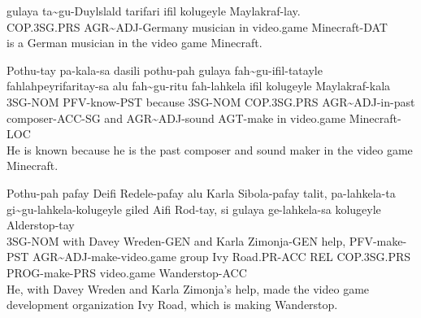 \begin{exe}
    \ex{} \gll{}gulaya ta\~{}gu-Duylslald tarifari ifil kolugeyle Maylakraf-lay.\\
                COP.3SG.PRS AGR\~{}ADJ-Germany musician in video.game Minecraft-DAT\\
          \glt{}is a German musician in the video game Minecraft.
\end{exe}

\begin{exe}
    \ex{} \gll{}Pothu-tay pa-kala-sa dasili pothu-pah gulaya fah\~{}gu-ifil-tatayle fahlahpeyrifaritay-sa alu fah\~{}gu-ritu fah-lahkela ifil kolugeyle Maylakraf-kala\\
                3SG-NOM PFV-know-PST because 3SG-NOM COP.3SG.PRS AGR\~{}ADJ-in-past composer-ACC-SG and AGR\~{}ADJ-sound AGT-make in video.game Minecraft-LOC\\
          \glt{}He is known because he is the past composer and sound maker in the video game Minecraft.
\end{exe}

\begin{exe}
    \ex{} \gll{}Pothu-pah pafay Deifi Redele-pafay alu Karla Sibola-pafay talit, pa-lahkela-ta gi\~{}gu-lahkela-kolugeyle giled Aifi Rod-tay, si gulaya ge-lahkela-sa kolugeyle Alderstop-tay\\
                3SG-NOM with Davey Wreden-GEN and Karla Zimonja-GEN help, PFV-make-PST AGR\~{}ADJ-make-video.game group Ivy Road.PR-ACC REL COP.3SG.PRS PROG-make-PRS video.game Wanderstop-ACC\\
          \glt{}He, with Davey Wreden and Karla Zimonja's help, made the video game development organization Ivy Road, which is making Wanderstop.
\end{exe}

